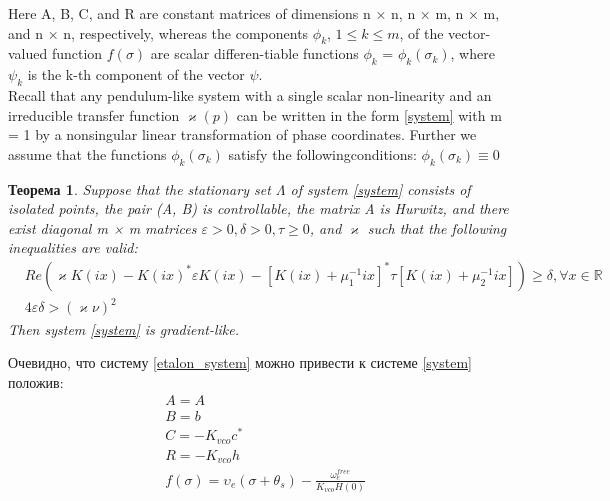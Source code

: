 \documentclass[a4paper]{article}
\newtheorem{theorem}{Теорема}
\begin{document}
Here A, B, C, and R are constant matrices of dimensions n × n, n × m, n × m, and n × n, respectively, whereas the components $\phi_k$, $1 \leq  k \leq m$, of the vector-valued function $f(\sigma)$ are scalar differen-tiable functions $\phi_k$ = $\phi_k(\sigma_k)$, where $\psi_k$ is the k-th component of the vector $\psi$.\\

Recall that any pendulum-like system with a single scalar non-linearity and an irreducible transfer function $\varkappa(p)$ can be written in the form \ref{system} with m = 1 by a nonsingular linear transformation of phase coordinates. Further we assume that the functions $\phi_k(\sigma_k)$ satisfy the followingconditions: $\phi_k(\sigma_k) \equiv 0$\\

\begin{theorem}
Suppose that the stationary set $\Lambda$ of system \ref{system} consists of isolated points, the pair (A, B) is controllable, the matrix A is Hurwitz, and there exist diagonal m × m matrices $\varepsilon > 0, \delta > 0, \tau \geq 0$, and $\varkappa$ such that the following inequalities are valid:
 \begin{equation}
 \begin{aligned}
&Re(\varkappa K(ix)-K(ix)^*\varepsilon K(ix)-[K(ix)+\mu_1^{-1}ix]^*\tau[K(ix)+\mu_2^{-1}ix])\geq\delta, \forall x \in \mathbb{R}\\
&4\varepsilon\delta > (\varkappa\nu)^2
 \end{aligned}
\end{equation}
Then system \ref{system} is gradient-like.
\end{theorem}

Очевидно, что систему \ref{etalon_system} можно привести к системе  \ref{system} положив: 
 \begin{equation}
 \begin{aligned}
&A=A\\
&B = b\\
&C = -K_{vco}c^*\\
&R = -K_{vco}h\\
&f(\sigma) = \upsilon_e(\sigma + \theta_s) - \frac{\omega_e^{free}}{K_{vco}H(0)}
\end{aligned}
\end{equation}
\end{document}
